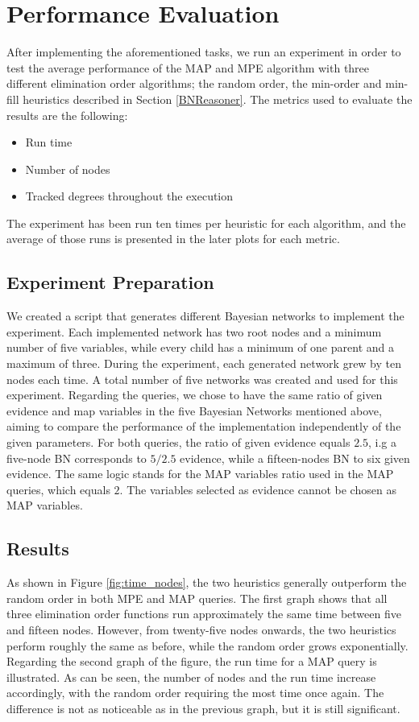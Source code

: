 \section{Performance Evaluation}
\label{Testing}

After implementing the aforementioned tasks, we run an experiment in order to test the average performance of the MAP and MPE algorithm with three different elimination order algorithms; the random order, the min-order and min-fill heuristics described in Section \ref{BNReasoner}. The metrics used to evaluate the results are the following:
\begin{itemize}
    \item Run time
    \item Number of nodes
    \item Tracked degrees throughout the execution
\end{itemize}
The experiment has been run ten times per heuristic for each algorithm, and the average of those runs is presented in the later plots for each metric.

\subsection{Experiment Preparation}
We created a script that generates different Bayesian networks to implement the experiment. Each implemented network has two root nodes and a minimum number of five variables, while every child has a minimum of one parent and a maximum of three. During the experiment, each generated network grew by ten nodes each time. A total number of five networks was created and used for this experiment. 
Regarding the queries, we chose to have the same ratio of given evidence and map variables in the five Bayesian Networks mentioned above, aiming to compare the performance of the implementation independently of the given parameters. For both queries, the ratio of given evidence equals $2.5$, i.g a five-node BN corresponds to $5/2.5$ evidence, while a fifteen-nodes BN to six given evidence. The same logic stands for the MAP variables ratio used in the MAP queries, which equals $2$. The variables selected as evidence cannot be chosen as MAP variables.

\subsection{Results}
As shown in Figure \ref{fig:time_nodes}, the two heuristics generally outperform the random order in both MPE and MAP queries. The first graph shows that all three elimination order functions run approximately the same time between five and fifteen nodes. However, from twenty-five nodes onwards, the two heuristics perform roughly the same as before, while the random order grows exponentially.\\
Regarding the second graph of the figure, the run time for a MAP query is illustrated. As can be seen, the number of nodes and the run time increase accordingly, with the random order requiring the most time once again. The difference is not as noticeable as in the previous graph, but it is still significant.

